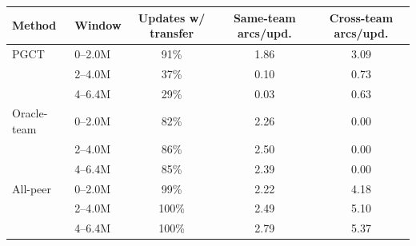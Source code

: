 \begin{tabular}{llccc}
\toprule
Method & Window & Updates w/ transfer & Same-team arcs/upd. & Cross-team arcs/upd. \\
\midrule
PGCT & 0--2.0M & 91\% & 1.86 & 3.09 \\
 & 2--4.0M & 37\% & 0.10 & 0.73 \\
 & 4--6.4M & 29\% & 0.03 & 0.63 \\
\addlinespace
Oracle-team & 0--2.0M & 82\% & 2.26 & 0.00 \\
 & 2--4.0M & 86\% & 2.50 & 0.00 \\
 & 4--6.4M & 85\% & 2.39 & 0.00 \\
\addlinespace
All-peer & 0--2.0M & 99\% & 2.22 & 4.18 \\
 & 2--4.0M & 100\% & 2.49 & 5.10 \\
 & 4--6.4M & 100\% & 2.79 & 5.37 \\
\bottomrule
\end{tabular}
